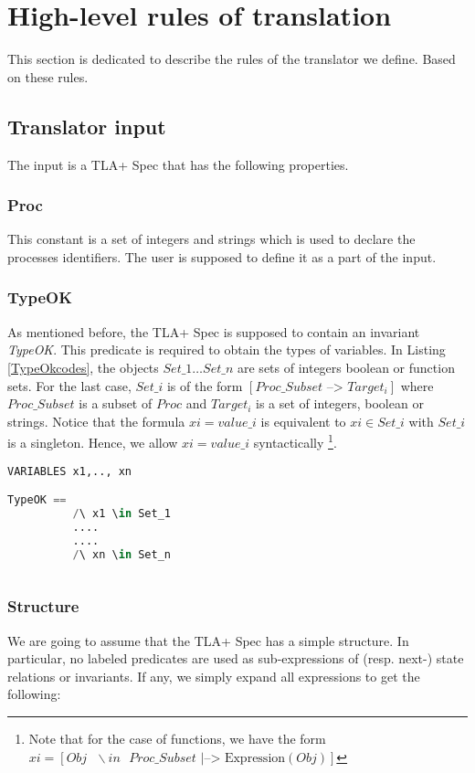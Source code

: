 \documentclass{article}
\theoremstyle{plain}
\numberwithin{equation}{section}
\begin{document}
\section{High-level rules of translation }
  


This section is dedicated to describe the rules of the translator we define. Based on these rules.  

\subsection{Translator input}
The input is a TLA+ Spec that has the following properties. 


\subsubsection{Proc}\label{Proc} This constant is a set of integers and strings which  is used to declare the processes identifiers. The user is supposed to define it as a part of the input.  

\subsubsection{TypeOK} \label{TypeOK} As mentioned before, the TLA+ Spec is supposed to contain an invariant \emph{TypeOK}.  This predicate is required to obtain the types of variables. In Listing \eqref{TypeOkcodes}, the objects $Set\_1 \dots Set\_n$ are sets of integers boolean or function sets. For the last case, $Set\_i$ is of the form $[ Proc\_Subset \text{   -->  }  Target_i]$ where $Proc\_Subset$ is a subset of $Proc$ and $Target_i$ is a set of integers, boolean or strings. 
 Notice that the formula $xi=value\_i$ is equivalent to $xi \in Set\_i$ with $Set\_i$ is a singleton. Hence, we allow $xi=value\_i$ syntactically \footnote{Note that for the case of functions, we have the form $xi=  [Obj \text{   }\backslash in \text{   } Proc\_Subset \text{   |-->  }  \text{Expression}(Obj)] $ }.


\begin{lstlisting}[language=Python,caption={The explicit form of the predicate \emph{TypeOK}.}, label={TypeOkcodes}] 
VARIABLES x1,.., xn

TypeOK == 
          /\ x1 \in Set_1
          ....
          ....
          /\ xn \in Set_n
 
\end{lstlisting}


\subsubsection{Structure} \label{Structure}
We are going to assume that the TLA+ Spec has a simple structure. In particular,
 no labeled predicates are used as sub-expressions of (resp. next-) state relations or invariants. If any,
 we simply expand all expressions to get the following: 
\end{document}
